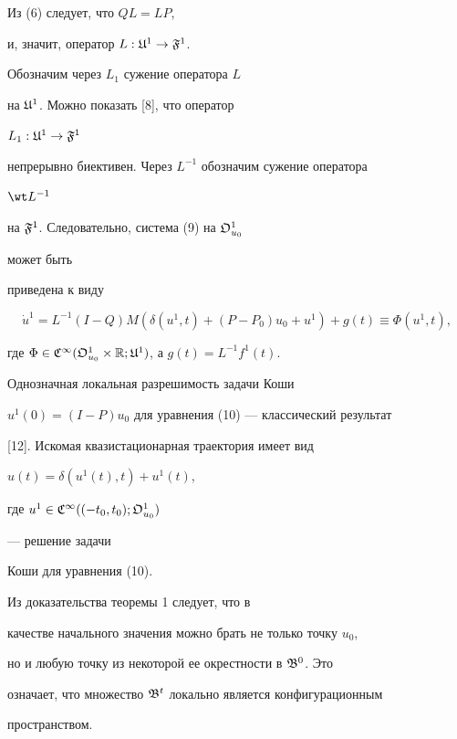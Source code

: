 \begin{pf}
Из (6) следует, что $QL=LP$,


и, значит, оператор $L:\frak U^1\to\frak F^1$.


Обозначим через $L_1$ сужение оператора $L$


на $\frak U^1$. Можно показать [8], что оператор


$L_1:\frak U^1\to\frak F^1$


непрерывно биективен. Через $L^{-1}$ обозначим сужение оператора


$\wt L^{-1}$


на $\frak F^1$. Следовательно, система (9) на $\frak O^1_{u_0}$


может быть


приведена к виду


\begin{equation}


\Dot u^1=L^{-1}(I-Q)M(\delta(u^1,t)+(P-P_0)u_0+u^1)+g(t)


\equiv\Phi(u^1,t),


\end{equation}


где $\Phi\in\frak C^\infty(\frak O^1_{u_0}\times\Bbb R;


\frak U^1)$, а $g(t)=L^{-1}f^1(t)$.





Однозначная локальная разрешимость задачи Коши


$u^1(0)=(I-P)u_0$ для уравнения (10) --- классический результат


[12]. Искомая квазистационарная траектория имеет вид


$u(t)=\delta(u^1(t),t)+u^1(t)$,


где $u^1\in\frak C^\infty((-t_0,t_0);\frak O^1_{u_0})$


--- решение задачи


Коши для уравнения (10).


\end{pf}





\begin{note} Из доказательства теоремы 1 следует, что в


качестве начального значения можно брать не только точку $u_0$,


но и любую точку из некоторой ее окрестности в $\frak B^0$. Это


означает, что множество $\frak B^t$ локально является конфигурационным


пространством.


\end{note}





